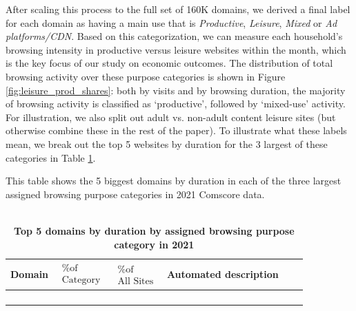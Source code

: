 \documentclass[12pt]{article}
\begin{document}
After scaling this process to the full set of 160K domains, we derived a final label for each domain as having a main use that is \textit{Productive}, \textit{Leisure}, \textit{Mixed} or \textit{Ad platforms/CDN}. Based on this categorization, we can measure each household's browsing intensity in productive versus leisure websites within the month, which is the key focus of our study on economic outcomes.   The distribution of total browsing activity over these purpose categories is shown in Figure \ref{fig:leisure_prod_shares}: both by visits and by browsing duration, the majority of browsing activity is classified as `productive', followed by `mixed-use' activity. For illustration, we also split out adult vs. non-adult content leisure sites (but otherwise combine these in the rest of the paper). To illustrate what these labels mean, we break out the top 5 websites by duration for the 3 largest of these categories in Table \ref{tab:top5-bycat}.






\begin{table}[!hbt]
\caption{\\ \textbf{Top 5 domains by duration by assigned browsing purpose category in 2021}} 
\footnotesize  This table shows the 5 biggest domains by duration in each of the three largest assigned browsing purpose categories in 2021 Comscore data. \label{tab:top5-bycat}

\centering \footnotesize
\begin{tabular}{@{} l c c c c >{\bfseries}c @{}}

 \addlinespace
 \toprule
 Domain  &  $\substack{\text{\% of}\\ \text{Category} }$  &  $\substack{\text{\% of}\\ \text{All Sites} }$ & Automated description  \\
                   \midrule
                   \addlinespace
 \multicolumn{4}{c}{\textbf{Productive Duration Top 5}} \\
\addlinespace
   
 \addlinespace
 \multicolumn{4}{c}{\textbf{Mixed-use Duration Top 5}} \\
 \addlinespace
   
\addlinespace
 \multicolumn{4}{c}{\textbf{Leisure (non-adult) Duration Top 5}} \\
 \addlinespace
   
 \bottomrule
\end{tabular} 

\end{table}
\end{document}
